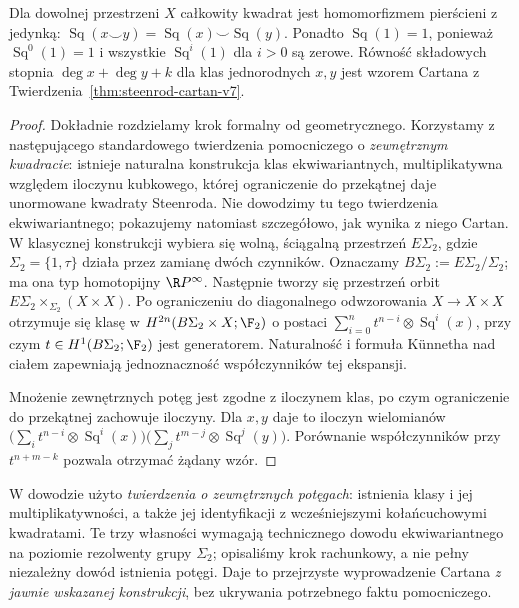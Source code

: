 \begin{twierdzenie}
\label{thm:cartan-v8}
Dla dowolnej przestrzeni $X$ całkowity kwadrat jest
homomorfizmem pierścieni z jedynką:
$\operatorname{Sq}(x\smile y)=\operatorname{Sq}(x)\smile\operatorname{Sq}(y)$.
Ponadto $\operatorname{Sq}(1)=1$, ponieważ
$\operatorname{Sq}^0(1)=1$ i wszystkie
$\operatorname{Sq}^i(1)$ dla $i>0$ są zerowe.
Równość składowych stopnia $\deg x+\deg y+k$
dla klas jednorodnych $x,y$ jest
wzorem Cartana z Twierdzenia~\ref{thm:steenrod-cartan-v7}.
\end{twierdzenie}
\begin{proof}
Dokładnie rozdzielamy krok formalny od geometrycznego.
Korzystamy z następującego standardowego twierdzenia
pomocniczego o \emph{zewnętrznym kwadracie}: istnieje
naturalna konstrukcja klas ekwiwariantnych, multiplikatywna
względem iloczynu kubkowego, której ograniczenie do
przekątnej daje unormowane kwadraty Steenroda.
Nie dowodzimy tu tego twierdzenia ekwiwariantnego;
pokazujemy natomiast szczegółowo, jak wynika z niego Cartan.
W klasycznej konstrukcji wybiera się wolną, ściągalną
przestrzeń $E\Sigma_2$, gdzie
$\Sigma_2=\{1,\tau\}$ działa przez zamianę dwóch czynników.
Oznaczamy $B\Sigma_2:=E\Sigma_2/\Sigma_2$;
ma ona typ homotopijny $\R P^\infty$.
Następnie tworzy się przestrzeń orbit
$E\Sigma_2\times_{\Sigma_2}(X\times X)$.
Po ograniczeniu do diagonalnego odwzorowania
$X\to X\times X$ otrzymuje się klasę w
$H^{2n}(B\Sigma_2\times X;\F_2)$ o postaci
$\sum_{i=0}^n t^{n-i}\otimes\operatorname{Sq}^i(x)$,
przy czym $t\in H^1(B\Sigma_2;\F_2)$ jest generatorem.
Naturalność i formuła Künnetha nad ciałem zapewniają jednoznaczność
współczynników tej ekspansji.

Mnożenie zewnętrznych potęg jest zgodne z iloczynem klas,
po czym ograniczenie do przekątnej zachowuje iloczyny.
Dla $x,y$ daje to iloczyn wielomianów
$\bigl(\sum_i t^{n-i}\otimes\operatorname{Sq}^i(x)\bigr)
 \bigl(\sum_j t^{m-j}\otimes\operatorname{Sq}^j(y)\bigr)$.
Porównanie współczynników przy $t^{n+m-k}$
pozwala otrzymać żądany wzór.
\end{proof}
\begin{uwaga}
W dowodzie użyto \emph{twierdzenia o zewnętrznych potęgach}:
istnienia klasy i jej multiplikatywności, a także jej
identyfikacji z wcześniejszymi kołańcuchowymi kwadratami.
Te trzy własności wymagają technicznego dowodu ekwiwariantnego
na poziomie rezolwenty grupy $\Sigma_2$; opisaliśmy krok rachunkowy,
a nie pełny niezależny dowód istnienia potęgi. Daje to przejrzyste
wyprowadzenie Cartana \emph{z jawnie wskazanej konstrukcji},
bez ukrywania potrzebnego faktu pomocniczego.
\end{uwaga}

